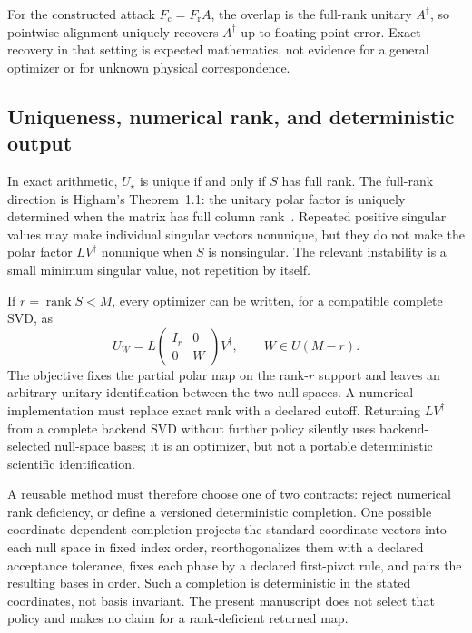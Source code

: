 For the constructed attack $F_{\mathrm c}=F_{\mathrm r}A$, the overlap is the
full-rank unitary $A^{\dagger}$, so pointwise alignment uniquely recovers
$A^{\dagger}$ up to floating-point error. Exact recovery in that setting is
expected mathematics, not evidence for a general optimizer or for unknown
physical correspondence.

\subsection{Uniqueness, numerical rank, and deterministic output}

In exact arithmetic, $U_{\star}$ is unique if and only if $S$ has full rank.
The full-rank direction is Higham's Theorem~1.1: the unitary polar factor is
uniquely determined when the matrix has full column rank~\cite{higham1986}.
Repeated positive singular values may make individual singular vectors
nonunique, but they do not make the polar factor $LV^{\dagger}$ nonunique when
$S$ is nonsingular. The relevant instability is a small minimum singular value,
not repetition by itself.

If $r=\operatorname{rank}S<M$, every optimizer can be written, for a compatible
complete SVD, as
\begin{equation}
  U_W
  =L
   \begin{pmatrix}
     I_r&0\\
     0&W
   \end{pmatrix}
   V^{\dagger},
  \qquad W\in U(M-r).
  \label{eq:training-composite-procrustes-rank-deficient-family}
\end{equation}
The objective fixes the partial polar map on the rank-$r$ support and leaves an
arbitrary unitary identification between the two null spaces. A numerical
implementation must replace exact rank with a declared cutoff. Returning
$LV^{\dagger}$ from a complete backend SVD without further policy silently
uses backend-selected null-space bases; it is an optimizer, but not a portable
deterministic scientific identification.

A reusable method must therefore choose one of two contracts: reject numerical
rank deficiency, or define a versioned deterministic completion. One possible
coordinate-dependent completion projects the standard coordinate vectors into
each null space in fixed index order, reorthogonalizes them with a declared
acceptance tolerance, fixes each phase by a declared first-pivot rule, and pairs
the resulting bases in order. Such a completion is deterministic in the stated
coordinates, not basis invariant. The present manuscript does not select that
policy and makes no claim for a rank-deficient returned map.

